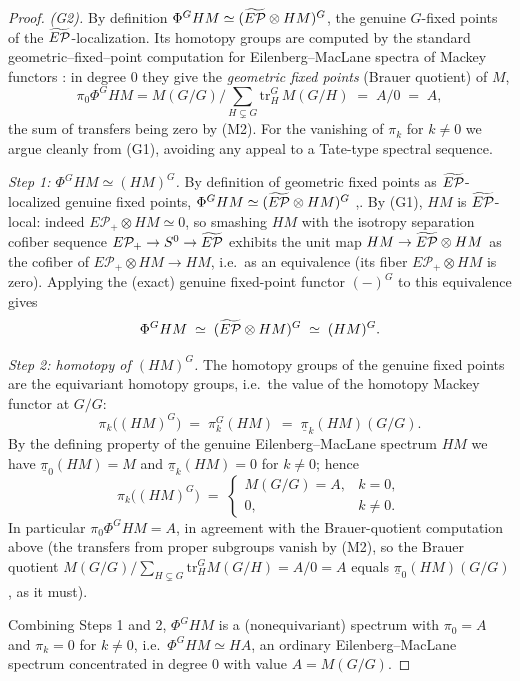 \begin{proof}
\emph{(G2).} By definition $\Phi^G HM\simeq(\widetilde{E\mathcal P}\otimes HM)^G$, the genuine
$G$-fixed points of the $\widetilde{E\mathcal P}$-localization. Its homotopy groups are computed
by the standard geometric--fixed--point computation for Eilenberg--MacLane
spectra of Mackey functors \cite[\S6]{HillPrimer}: in degree $0$ they give the
\emph{geometric fixed points} (Brauer quotient) of $M$,
\[
\pi_0\Phi^G HM= M(G/G)\Big/\!\sum_{H\subsetneq G}\mathrm{tr}^G_H\,M(G/H)
\;=\;A/0\;=\;A,
\]
the sum of transfers being zero by (M2). For the vanishing of $\pi_k$ for $k\ne 0$ we argue cleanly from (G1), avoiding
any appeal to a Tate-type spectral sequence.

\emph{Step 1: $\Phi^G HM\simeq (HM)^G$.} By definition of geometric fixed points
as $\widetilde{E\mathcal P}$-localized genuine fixed points,
$\Phi^G HM\simeq(\widetilde{E\mathcal P}\otimes HM)^G$
\cite[\S2.5.2]{HHR16},\cite[\S6]{HillPrimer}. By (G1), $HM$ is $\widetilde{E\mathcal P}$-local:
indeed $E\mathcal P_+\otimes HM\simeq 0$, so smashing $HM$ with the isotropy
separation cofiber sequence $E\mathcal P_+\to S^0\to\widetilde{E\mathcal P}$ exhibits the unit
map $HM\to\widetilde{E\mathcal P}\otimes HM$ as the cofiber of $E\mathcal P_+\otimes HM\to HM$,
i.e.\ as an equivalence (its fiber $E\mathcal P_+\otimes HM$ is zero). Applying
the (exact) genuine fixed-point functor $(-)^G$ to this equivalence gives
\[
\Phi^G HM\;\simeq\;(\widetilde{E\mathcal P}\otimes HM)^G\;\simeq\;(HM)^G .
\]

\emph{Step 2: homotopy of $(HM)^G$.} The homotopy groups of the genuine fixed
points are the equivariant homotopy groups, i.e.\ the value of the homotopy
Mackey functor at $G/G$:
\[
\pi_k\bigl((HM)^G\bigr)\;=\;\pi_k^G(HM)\;=\;\underline\pi_k(HM)(G/G).
\]
By the defining property of the genuine Eilenberg--MacLane spectrum $HM$ we have
$\underline\pi_0(HM)=M$ and $\underline\pi_k(HM)=0$ for $k\ne 0$; hence
\[
\pi_k\bigl((HM)^G\bigr)\;=\;
\begin{cases}
M(G/G)=A, & k=0,\\[2pt]
0, & k\ne 0.
\end{cases}
\]
In particular $\pi_0\Phi^G HM=A$, in agreement with the Brauer-quotient
computation above (the transfers from proper subgroups vanish by (M2), so the
Brauer quotient $M(G/G)/\sum_{H\subsetneq G}\mathrm{tr}^G_H M(G/H)=A/0=A$ equals
$\underline\pi_0(HM)(G/G)$, as it must).

Combining Steps 1 and 2, $\Phi^G HM$ is a (nonequivariant) spectrum with
$\pi_0=A$ and $\pi_k=0$ for $k\ne 0$, i.e.\ $\Phi^G HM\simeq HA$, an ordinary
Eilenberg--MacLane spectrum concentrated in degree $0$ with value $A=M(G/G)$.
\end{proof}

